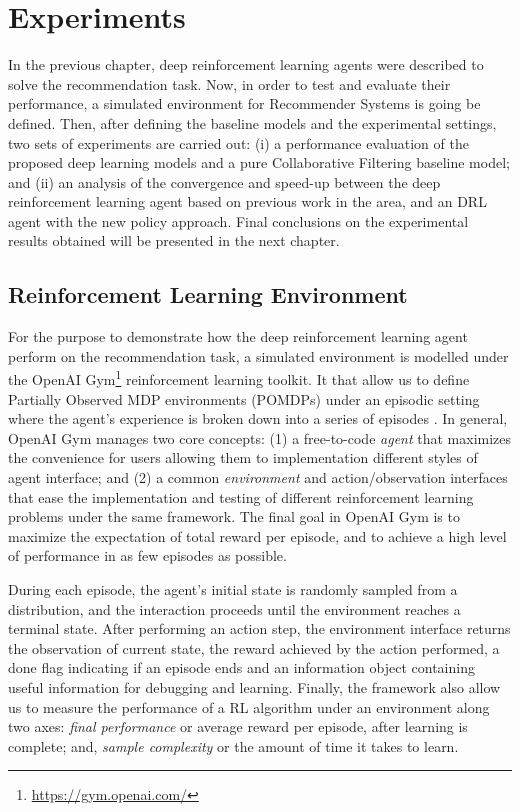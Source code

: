 \chapter{Experiments}
\label{sec:chapterlabel4}

In the previous chapter, deep reinforcement learning agents were described to solve the recommendation task. Now, in order to test and evaluate their performance, a simulated environment for Recommender Systems is going be defined. Then, after defining the baseline models and the experimental settings, two sets of experiments are carried out: (i) a performance evaluation of the proposed deep learning models and a pure Collaborative Filtering baseline model; and (ii) an analysis of the convergence and speed-up between the deep reinforcement learning agent based on previous work in the area, and an DRL agent with the new policy approach. Final conclusions on the experimental results obtained will be presented in the next chapter.

\section{Reinforcement Learning Environment}

For the purpose to demonstrate how the deep reinforcement learning agent perform on the recommendation task, a simulated environment is modelled under the OpenAI Gym\footnote{\url{https://gym.openai.com/}} reinforcement learning toolkit. It that allow us to define Partially Observed MDP environments (POMDPs)  under an episodic setting where the agent's experience is broken down into a series of episodes \cite{brockman2016openai}. In general, OpenAI Gym manages two core concepts: (1) a free-to-code \textit{agent} that maximizes the convenience for users allowing them to implementation different styles of agent interface; and (2) a common \textit{environment} and action/observation interfaces that ease the implementation and testing of different reinforcement learning problems under the same framework. The final goal in OpenAI Gym is to maximize the expectation of total reward per episode, and to achieve a high level of performance in as few episodes as possible.

During each episode, the agent's initial state is randomly sampled from a distribution, and the interaction proceeds until the environment reaches a terminal state. After performing an action step, the environment interface returns the observation of current state, the reward achieved by the action performed, a done flag indicating if an episode ends and an information object containing useful information for debugging and learning. Finally, the framework also allow us to measure the performance of a RL algorithm under an environment along two axes: \textit{final performance} or average reward per episode, after learning is complete; and, \textit{sample complexity} or the amount of time it takes to learn. 

